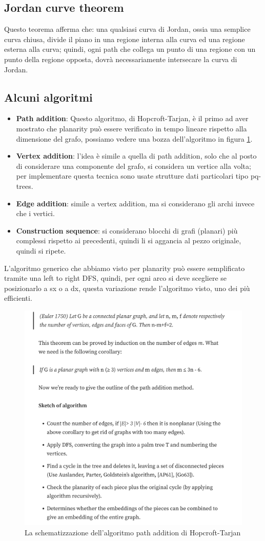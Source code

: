 \documentclass[12pt,a4paper]{article}
\begin{document}
\subsection{Jordan curve theorem}
Questo teorema afferma che: una qualsiasi curva di Jordan, ossia una semplice curva chiusa, divide il piano in una regione interna alla curva ed una regione esterna alla curva; quindi, ogni path che collega un punto di una regione con un punto della regione opposta, dovrà necessariamente intersecare la curva di Jordan.

\subsection{Alcuni algoritmi}
\begin{itemize}
\item \textbf{Path addition}: Questo algoritmo, di Hopcroft-Tarjan, è il primo ad aver mostrato che planarity può essere verificato in tempo lineare rispetto alla dimensione del grafo, possiamo vedere una bozza dell'algoritmo in figura \ref{fig:path_add}.
\item \textbf{Vertex addition}: l'idea è simile a quella di path addition, solo che al posto di considerare una componente del grafo, si considera un vertice alla volta; per implementare questa tecnica sono usate strutture dati particolari tipo pq-trees.
\item \textbf{Edge addition}: simile a vertex addition, ma si considerano gli archi invece che i vertici.
\item \textbf{Construction sequence}: si considerano blocchi di grafi (planari) più complessi rispetto ai precedenti, quindi li si aggancia al pezzo originale, quindi si ripete.
\end{itemize}
L'algoritmo generico che abbiamo visto per planarity può essere semplificato tramite una left to right DFS, quindi, per ogni arco si deve scegliere se posizionarlo a sx o a dx, questa variazione rende l'algoritmo visto, uno dei più efficienti.

\begin{figure}[h]
	\centering
	\includegraphics[width=1\linewidth]{img/path_add.png}
	\caption{La schematizzazione dell'algoritmo path addition di Hopcroft-Tarjan}
	\label{fig:path_add}
\end{figure}
\end{document}
